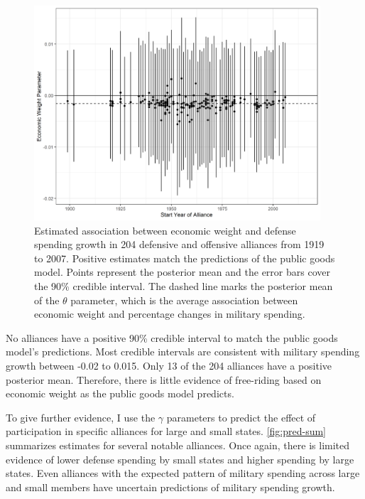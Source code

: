 \documentclass[12pt]{article}
\begin{document}
\begin{figure}[htbp]
	\centering
		\includegraphics[width=0.95\textwidth]{alliance-coefs-year.png}
	\caption{Estimated association between economic weight and defense spending growth in 204 defensive and offensive alliances from 1919 to 2007. Positive estimates match the predictions of the public goods model. Points represent the posterior mean and the error bars cover the 90\% credible interval. The dashed line marks the posterior mean of the $\theta$ parameter, which is the average association between economic weight and percentage changes in military spending.}
	\label{fig:alliance-coefs-year}
\end{figure}


No alliances have a positive 90\% credible interval to match the public goods model's predictions. 
Most credible intervals are consistent with military spending growth between -0.02 to 0.015. 
Only 13 of the 204 alliances have a positive posterior mean. 
Therefore, there is little evidence of free-riding based on economic weight as the public goods model predicts. 


To give further evidence, I use the $\gamma$ parameters to predict the effect of participation in specific alliances for large and small states.
\autoref{fig:pred-sum} summarizes estimates for several notable alliances. 
Once again, there is limited evidence of lower defense spending by small states and higher spending by large states. 
Even alliances with the expected pattern of military spending across large and small members have uncertain predictions of military spending growth.  
\end{document}
